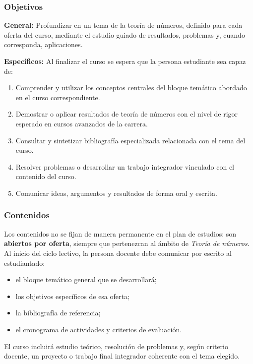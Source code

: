 \begin{refsection}
\subsubsection*{Objetivos}

\textbf{General:} Profundizar en un tema de la teoría de números, definido para cada oferta del curso, mediante el estudio guiado de resultados, problemas y, cuando corresponda, aplicaciones.

\textbf{Específicos:} Al finalizar el curso se espera que la persona estudiante sea capaz de:

\begin{enumerate}
\item Comprender y utilizar los conceptos centrales del bloque temático abordado en el curso correspondiente.
\item Demostrar o aplicar resultados de teoría de números con el nivel de rigor esperado en cursos avanzados de la carrera.
\item Consultar y sintetizar bibliografía especializada relacionada con el tema del curso.
\item Resolver problemas o desarrollar un trabajo integrador vinculado con el contenido del curso.
\item Comunicar ideas, argumentos y resultados de forma oral y escrita.
\end{enumerate}

\subsubsection*{Contenidos}

Los contenidos no se fijan de manera permanente en el plan de estudios: son \textbf{abiertos por oferta}, siempre que pertenezcan al ámbito de \emph{Teoría de números}. Al inicio del ciclo lectivo, la persona docente debe comunicar por escrito al estudiantado:

\begin{itemize}
\item el bloque temático general que se desarrollará;
\item los objetivos específicos de esa oferta;
\item la bibliografía de referencia;
\item el cronograma de actividades y criterios de evaluación.
\end{itemize}

El curso incluirá estudio teórico, resolución de problemas y, según criterio docente, un proyecto o trabajo final integrador coherente con el tema elegido.


\end{refsection}
